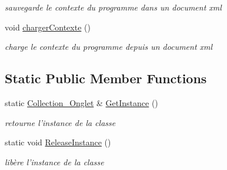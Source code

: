 \begin{DoxyCompactItemize}
\begin{DoxyCompactList}\small\item\em sauvegarde le contexte du programme dans un document xml \item\end{DoxyCompactList}\item 
\hypertarget{classCollection__Onglet_a7822474e999ad488e054d28f2a36be66}{
void \hyperlink{classCollection__Onglet_a7822474e999ad488e054d28f2a36be66}{chargerContexte} ()}
\label{classCollection__Onglet_a7822474e999ad488e054d28f2a36be66}

\begin{DoxyCompactList}\small\item\em charge le contexte du programme depuis un document xml \item\end{DoxyCompactList}\end{DoxyCompactItemize}
\subsection*{Static Public Member Functions}
\begin{DoxyCompactItemize}
\item 
\hypertarget{classCollection__Onglet_ae65253b1cf9c29937f2256db241732a8}{
static \hyperlink{classCollection__Onglet}{Collection\_\-Onglet} \& \hyperlink{classCollection__Onglet_ae65253b1cf9c29937f2256db241732a8}{GetInstance} ()}
\label{classCollection__Onglet_ae65253b1cf9c29937f2256db241732a8}

\begin{DoxyCompactList}\small\item\em retourne l'instance de la classe \item\end{DoxyCompactList}\item 
\hypertarget{classCollection__Onglet_ad18acceed361430b7def48e66f44b0b8}{
static void \hyperlink{classCollection__Onglet_ad18acceed361430b7def48e66f44b0b8}{ReleaseInstance} ()}
\label{classCollection__Onglet_ad18acceed361430b7def48e66f44b0b8}

\begin{DoxyCompactList}\small\item\em libère l'instance de la classe \item\end{DoxyCompactList}\end{DoxyCompactItemize}


